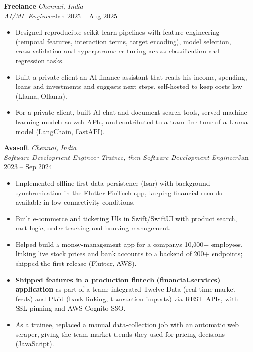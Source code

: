\documentclass[a4paper,11pt]{article}
\newcommand{\role}[4]{%
  \textbf{#1}{\color{muted}\,\textperiodcentered\,\textit{#2}}\\
  \textit{#4}\hfill{\color{muted}#3}\par}
\newcommand{\gap}{\vspace{5pt}}
\newcommand{\num}[1]{\textbf{#1}}   %
\begin{document}
\gap
{}
\role{Freelance}{Chennai, India}{Jan 2025 – Aug 2025}{AI/ML Engineer}
\begin{itemize}
  \item Designed reproducible scikit-learn pipelines with feature engineering (temporal features, interaction terms, target encoding), model selection, cross-validation and hyperparameter tuning across classification and regression tasks.
  \item Built a private client an AI finance assistant that reads his income, spending, loans and investments and suggests next steps, self-hosted to keep costs low (Llama, Ollama).
  \item For a private client, built AI chat and document-search tools, served machine-learning models as web APIs, and contributed to a team fine-tune of a Llama model (LangChain, FastAPI).
\end{itemize}
\gap
{}
\role{Avasoft}{Chennai, India}{Jan 2023 – Sep 2024}{Software Development Engineer Trainee, then Software Development Engineer}
\begin{itemize}
  \item Implemented offline-first data persistence (Isar) with background synchronisation in the Flutter FinTech app, keeping financial records available in low-connectivity conditions.
  \item Built e-commerce and ticketing UIs in Swift/SwiftUI with product search, cart logic, order tracking and booking management.
  \item Helped build a money-management app for a company\textquotesingle{}s 10,000+ employees, linking live stock prices and bank accounts to a backend of 200+ endpoints; shipped the first release (Flutter, AWS).
  \item \num{Shipped features in a production fintech (financial-services) application} as part of a team: integrated Twelve Data (real-time market feeds) and Plaid (bank linking, transaction imports) via REST APIs, with SSL pinning and AWS Cognito SSO.
  \item As a trainee, replaced a manual data-collection job with an automatic web scraper, giving the team market trends they used for pricing decisions (JavaScript).
\end{itemize}
\end{document}
